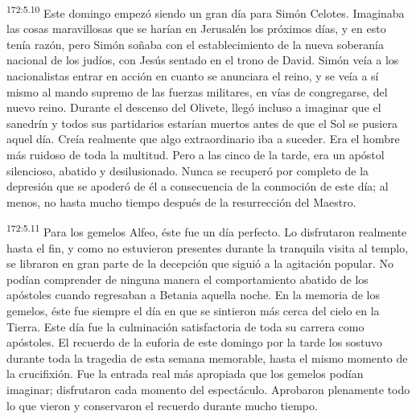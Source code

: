 \par 
\textsuperscript{172:5.10} Este domingo empezó siendo un gran día para Simón Celotes. Imaginaba las cosas maravillosas que se harían en Jerusalén los próximos días, y en esto tenía razón, pero Simón soñaba con el establecimiento de la nueva soberanía nacional de los judíos, con Jesús sentado en el trono de David. Simón veía a los nacionalistas entrar en acción en cuanto se anunciara el reino, y se veía a sí mismo al mando supremo de las fuerzas militares, en vías de congregarse, del nuevo reino. Durante el descenso del Olivete, llegó incluso a imaginar que el sanedrín y todos sus partidarios estarían muertos antes de que el Sol se pusiera aquel día. Creía realmente que algo extraordinario iba a suceder. Era el hombre más ruidoso de toda la multitud. Pero a las cinco de la tarde, era un apóstol silencioso, abatido y desilusionado. Nunca se recuperó por completo de la depresión que se apoderó de él a consecuencia de la conmoción de este día; al menos, no hasta mucho tiempo después de la resurrección del Maestro.

\par 
\textsuperscript{172:5.11} Para los gemelos Alfeo, éste fue un día perfecto. Lo disfrutaron realmente hasta el fin, y como no estuvieron presentes durante la tranquila visita al templo, se libraron en gran parte de la decepción que siguió a la agitación popular. No podían comprender de ninguna manera el comportamiento abatido de los apóstoles cuando regresaban a Betania aquella noche. En la memoria de los gemelos, éste fue siempre el día en que se sintieron más cerca del cielo en la Tierra. Este día fue la culminación satisfactoria de toda su carrera como apóstoles. El recuerdo de la euforia de este domingo por la tarde los sostuvo durante toda la tragedia de esta semana memorable, hasta el mismo momento de la crucifixión. Fue la entrada real más apropiada que los gemelos podían imaginar; disfrutaron cada momento del espectáculo. Aprobaron plenamente todo lo que vieron y conservaron el recuerdo durante mucho tiempo.

